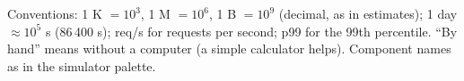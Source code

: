 \vspace{.2em}
{\small\color{soft}Conventions: 1 K $= 10^3$, 1 M $= 10^6$, 1 B $= 10^9$ (decimal, as in estimates); 1 day $\approx 10^5$ s (86\,400 s); req/s for requests per second; p99 for the 99th percentile. ``By hand'' means without a computer (a simple calculator helps). Component names as in the simulator palette.}

\normalsize\setlength{\parskip}{.4em}
